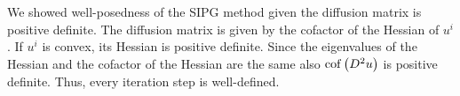 We showed well-posedness of the SIPG method given the diffusion matrix is positive definite. The diffusion matrix is given by the cofactor of the Hessian of $u^i$. If $u^i$ is convex, its Hessian is positive definite. Since the eigenvalues of the Hessian and the cofactor of the Hessian are the same also $\operatorname{cof} \left( D^2 u \right)$ is positive definite. Thus, every iteration step is well-defined.

%
%
%
%
%
